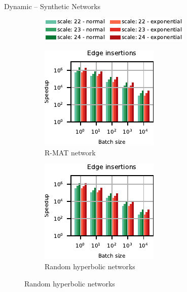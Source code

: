 \documentclass[10pt,titlepage,english,presentation]{beamer}
\begin{document}
\begin{frame}[t]{Dynamic \suitor -- Synthetic Networks}
\begin{figure}
\begin{subfigure}[t]{\textwidth}
\centering
\includegraphics{../sources/plots/dyn-mwm/legend-synthetic.pdf}
\end{subfigure}\medskip

\begin{subfigure}[t]{.5\textwidth}
\centering
\includegraphics[width=.7\textwidth]{../sources/plots/dyn-mwm/speedup-rmat-insertion.pdf}
\caption*{\scriptsize R-MAT network}
\end{subfigure}\hfill
\begin{subfigure}[t]{.5\textwidth}
\centering
\includegraphics[width=.7\textwidth]{../sources/plots/dyn-mwm/speedup-hyperbolic-insertion.pdf}
\caption*{\scriptsize Random hyperbolic networks}
\end{subfigure}
\end{figure}
\end{frame}

\else
\fi
\end{document}
